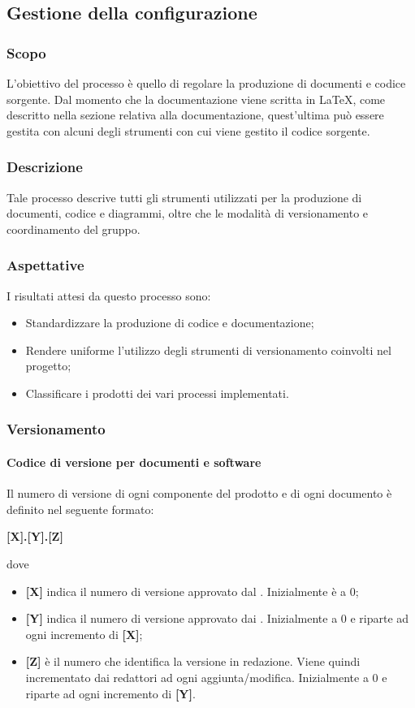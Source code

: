 \subsection{Gestione della configurazione}
\subsubsection{Scopo}
L'obiettivo del processo è quello di regolare la produzione di documenti e codice sorgente.
Dal momento che la documentazione viene scritta in \LaTeX, come descritto nella sezione relativa
alla documentazione, quest'ultima può essere gestita con alcuni degli strumenti con
cui viene gestito il codice sorgente.

\subsubsection{Descrizione}
Tale processo descrive tutti gli strumenti utilizzati per la produzione di documenti, codice e diagrammi,
oltre che le modalità di versionamento e coordinamento del gruppo.

\subsubsection{Aspettative}
I risultati attesi da questo processo sono:
\begin{itemize}
    \item Standardizzare la produzione di codice e documentazione;
    \item Rendere uniforme l'utilizzo degli strumenti di versionamento coinvolti nel progetto;
    \item Classificare i prodotti dei vari processi implementati.
\end{itemize}

\subsubsection{Versionamento}
\paragraph{Codice di versione per documenti e software}
Il numero di versione di ogni componente del prodotto e di ogni documento è definito nel seguente formato:
\begin{center}
    \textbf{[X].[Y].[Z]}
\end{center}
dove
\begin{itemize}
    \item \textbf{[X]} indica il numero di versione approvato dal . Inizialmente è a 0;
    \item \textbf{[Y]} indica il numero di versione approvato dai . Inizialmente a 0 e riparte ad ogni
                       incremento di \textbf{[X]};
    \item \textbf{[Z]} è il numero che identifica la versione in redazione. Viene quindi incrementato dai redattori
                       ad ogni aggiunta/modifica. Inizialmente a 0 e riparte ad ogni incremento di \textbf{[Y]}.
\end{itemize}

